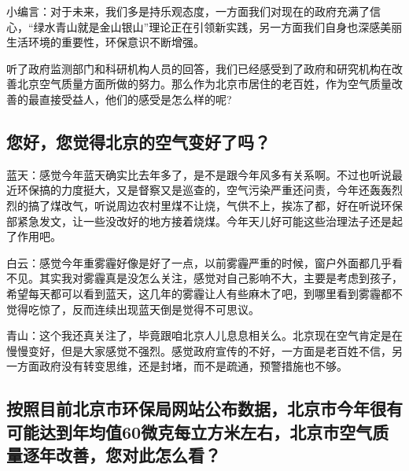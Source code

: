 \documentclass[]{book}
\begin{document}
小编言：对于未来，我们多是持乐观态度，一方面我们对现在的政府充满了信心，``绿水青山就是金山银山''理论正在引领新实践，另一方面我们自身也深感美丽生活环境的重要性，环保意识不断增强。

听了政府监测部门和科研机构人员的回答，我们已经感受到了政府和研究机构在改善北京空气质量方面所做的努力。那么作为北京市居住的老百姓，作为空气质量改善的最直接受益人，他们的感受是怎么样的呢?

\hypertarget{ux60a8ux597dux60a8ux89c9ux5f97ux5317ux4eacux7684ux7a7aux6c14ux53d8ux597dux4e86ux5417}{%
\subsection{您好，您觉得北京的空气变好了吗？}\label{ux60a8ux597dux60a8ux89c9ux5f97ux5317ux4eacux7684ux7a7aux6c14ux53d8ux597dux4e86ux5417}}

蓝天：感觉今年蓝天确实比去年多了，是不是跟今年风多有关系啊。不过也听说最近环保搞的力度挺大，又是督察又是巡查的，空气污染严重还问责，今年还轰轰烈烈的搞了煤改气，听说周边农村里煤不让烧，气供不上，挨冻了都，好在听说环保部紧急发文，让一些没改好的地方接着烧煤。今年天儿好可能这些治理法子还是起了作用吧。

白云：感觉今年重雾霾好像是好了一点，以前雾霾严重的时候，窗户外面都几乎看不见。其实我对雾霾真是没怎么关注，感觉对自己影响不大，主要是考虑到孩子，希望每天都可以看到蓝天，这几年的雾霾让人有些麻木了吧，到哪里看到雾霾都不觉得吃惊了，反而连续出现蓝天倒是觉得不可思议。

青山：这个我还真关注了，毕竟跟咱北京人儿息息相关么。北京现在空气肯定是在慢慢变好，但是大家感觉不强烈。感觉政府宣传的不好，一方面是老百姓不信，另一方面政府没有转变思维，还是封堵，而不是疏通，预警措施也不够。

\hypertarget{ux6309ux7167ux76eeux524dux5317ux4eacux5e02ux73afux4fddux5c40ux7f51ux7ad9ux516cux5e03ux6570ux636eux5317ux4eacux5e02ux4ecaux5e74ux5f88ux6709ux53efux80fdux8fbeux5230ux5e74ux5747ux503c60ux5faeux514bux6bcfux7acbux65b9ux7c73ux5de6ux53f3ux5317ux4eacux5e02ux7a7aux6c14ux8d28ux91cfux9010ux5e74ux6539ux5584ux60a8ux5bf9ux6b64ux600eux4e48ux770b}{%
\subsection{按照目前北京市环保局网站公布数据，北京市今年很有可能达到年均值60微克每立方米左右，北京市空气质量逐年改善，您对此怎么看？}\label{ux6309ux7167ux76eeux524dux5317ux4eacux5e02ux73afux4fddux5c40ux7f51ux7ad9ux516cux5e03ux6570ux636eux5317ux4eacux5e02ux4ecaux5e74ux5f88ux6709ux53efux80fdux8fbeux5230ux5e74ux5747ux503c60ux5faeux514bux6bcfux7acbux65b9ux7c73ux5de6ux53f3ux5317ux4eacux5e02ux7a7aux6c14ux8d28ux91cfux9010ux5e74ux6539ux5584ux60a8ux5bf9ux6b64ux600eux4e48ux770b}}
\end{document}
